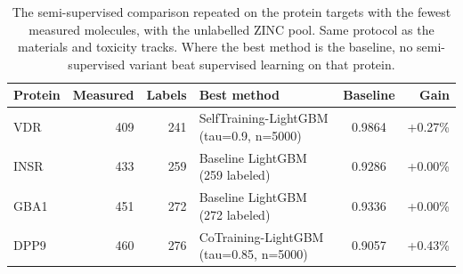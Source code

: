 \begin{table}[H]
\centering\small
\begin{tabular}{lrrlcr}
\toprule
Protein & Measured & Labels & Best method & Baseline & Gain\\
\midrule
VDR & 409 & 241 & SelfTraining-LightGBM (tau=0.9, n=5000) & 0.9864 & +0.27\% \\
INSR & 433 & 259 & Baseline LightGBM (259 labeled) & 0.9286 & +0.00\% \\
GBA1 & 451 & 272 & Baseline LightGBM (272 labeled) & 0.9336 & +0.00\% \\
DPP9 & 460 & 276 & CoTraining-LightGBM (tau=0.85, n=5000) & 0.9057 & +0.43\% \\
\bottomrule
\end{tabular}
\caption{The semi-supervised comparison repeated on the protein targets with the fewest measured molecules, with the unlabelled ZINC pool. Same protocol as the materials and toxicity tracks. Where the best method is the baseline, no semi-supervised variant beat supervised learning on that protein. }\label{tab:targets-ssl}
\end{table}
